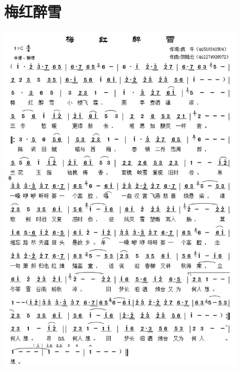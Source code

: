 \documentclass[cn,pad,twocol]{elegantbook}
\begin{document}
\section{梅红醉雪} \includegraphics[width=0.9\textwidth]{rpi400/20210206梅红醉雪.jpg}
\end{document}
